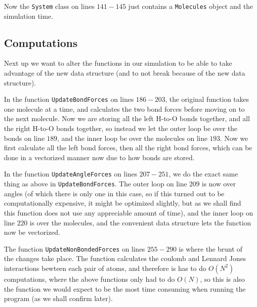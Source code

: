 \documentclass{article}
\begin{document}
Now the \texttt{System} class on lines $141-145$ just contains a \texttt{Molecules} object and the simulation time.

\subsection{Computations}
Next up we want to alter the functions in our simulation to be able to take advantage of the new data structure (and to not break because of the new data structure). 

In the function \texttt{UpdateBondForces} on lines $186-203$, the original function takes one molecule at a time, and calculates the two bond forces before moving on to the next molecule. Now we are storing all the left H-to-O bonds together, and all the right H-to-O bonds together, so instead we let the outer loop be over the bonds on line $189$, and the inner loop be over the molecules on line $193$. Now we first calculate all the left bond forces, then all the right bond forces, which can be done in a vectorized manner now due to how bonds are stored.

In the function \texttt{UpdateAngleForces} on lines $207-251$, we do the exact same thing as above in \texttt{UpdateBondForces}. The outer loop on line $209$ is now over angles (of which there is only one in this case, so if this turned out to be computationally expensive, it might be optimized slightly, but as we shall find this function does not use any appreciable amount of time), and the inner loop on line $220$ is over the molecules, and the convenient data structure lets the function now be vectorized.

The function \texttt{UpdateNonBondedForces} on lines $255-290$ is where the brunt of the changes take place. The function calculates the coulomb and Lennard Jones interactions bewteen each pair of atoms, and therefore is has to do $O(N^2)$ computations,  where the above functions only had to do $O(N)$, so this is also the function we would expect to be the most time consuming when running the program (as we shall confirm later).
\end{document}
